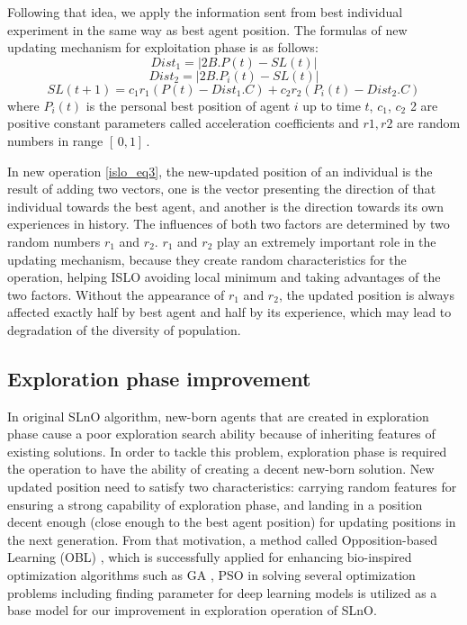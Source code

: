 \documentclass[a4paper,13pt,2p]{report}
\begin{document}
	Following that idea, we apply the information sent from best individual experiment in the same way as best agent position. The formulas of new updating mechanism for exploitation phase is as follows:
\begin{equation}\label{islo_eq1}
Dist_1 = |2B.P(t) - SL(t)| 
\end{equation}
\begin{equation}\label{islo_eq2}
Dist_2 = |2B.P_i(t) - SL(t)| 
\end{equation}
\begin{equation}\label{islo_eq3}
SL(t+1) = c_1r_1(P(t) - Dist_1.C) + c_2r_2(P_i(t) - Dist_2.C)
\end{equation}
where $P_i(t)$ is the personal best position of agent $i$ up to time $t$, $c_1$, $c_2$ 2 are positive constant parameters called acceleration coefficients and $r1, r2$ are random numbers in range $[\, 0,1 ] \,$.

	In new operation \ref{islo_eq3}, the new-updated position of an individual is the result of adding two vectors, one is the vector presenting the direction of that individual towards the best agent, and another is the direction towards its own experiences in history. The influences of both two factors are determined by two random numbers $r_1$ and $r_2$. $r_1$ and $r_2$ play an extremely important role in the updating mechanism,  because  they create random characteristics for the operation, helping ISLO avoiding local minimum and taking advantages of the two factors. Without the appearance of $r_1$ and $r_2$, the updated position is always affected exactly half by best agent and half by its experience, which may lead to degradation of the diversity of population. 

\subsection{Exploration phase improvement}
\label{imprv_explore}
	
	In original SLnO algorithm, new-born agents that are created in exploration phase cause a poor exploration search ability because of inheriting features of existing solutions. In order to tackle this problem, exploration phase is required the operation to have the ability of creating a decent new-born solution. New updated position need to satisfy two characteristics: carrying random features for ensuring a strong capability of exploration phase, and landing in a position decent enough (close enough to the best agent position) for updating positions in the next generation. From that motivation, a method called Opposition-based Learning (OBL) \cite{tizhoosh2005opposition}, which is successfully applied for enhancing bio-inspired optimization algorithms such as GA \cite{tizhoosh2005opposition}, PSO \cite{wang2007opposition} \cite{tang2009enhanced} in solving several optimization problems including finding parameter for deep learning models \cite{rashid2010improved} \cite{nguyen2019efficient} is utilized as a base model for our improvement in exploration operation of SLnO. 
	
\end{document}
